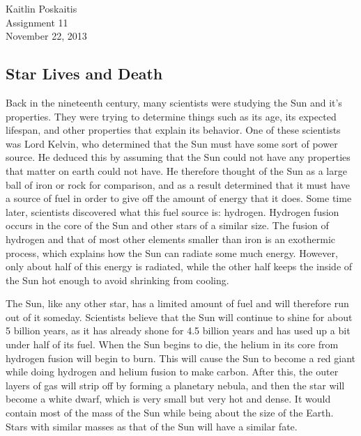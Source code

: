 \documentclass[12pt]{article}
\begin{document}
\noindent Kaitlin Poskaitis\\
Assignment 11\\
November 22, 2013
\begin{center}
    \section*{\bf Star Lives and Death}
\end{center}

Back in the nineteenth century, many scientists were studying the Sun and it's
properties.  They were trying to determine things such as its age, its expected
lifespan, and other properties that explain its behavior.  One of these
scientists was Lord Kelvin, who determined that the Sun must have some sort of
power source.  He deduced this by assuming that the Sun could not have any
properties that matter on earth could not have.  He therefore thought of the Sun
as a large ball of iron or rock for comparison, and as a result determined that
it must have a source of fuel in order to give off the amount of energy that it
does.  Some time later, scientists discovered what this fuel source is:
hydrogen. Hydrogen fusion occurs in the core of the Sun and other stars of a
similar size. The fusion of hydrogen and that of most other elements smaller
than iron is an exothermic process, which explains how the Sun can radiate some
much energy.  However, only about half of this energy is radiated, while the
other half keeps the inside of the Sun hot enough to avoid shrinking from
cooling.

The Sun, like any other star, has a limited amount of fuel and will therefore
run out of it someday.  Scientists believe that the Sun will continue to shine
for about 5 billion years, as it has already shone for 4.5 billion years and has
used up a bit under half of its fuel.  When the Sun begins to die, the helium in
its core from hydrogen fusion will begin to burn.  This will cause the Sun to
become a red giant while doing hydrogen and helium fusion to make carbon.  After
this, the outer layers of gas will strip off by forming a planetary nebula, and
then the star will become a white dwarf, which is very small but very hot and
dense. It would contain most of the mass of the Sun while being about the size
of the Earth.  Stars with similar masses as that of the Sun will have a similar
fate.
\end{document}
